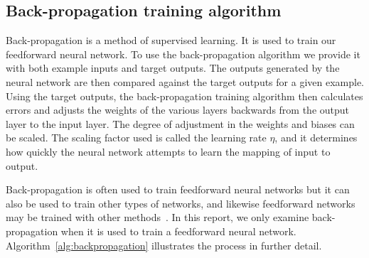 \documentclass[11pt]{article}
\begin{document}

\subsection{Back-propagation training algorithm} %
\label{sub:backpropagation_training_algorithm}

Back-propagation is a method of supervised learning. It is used to train our feedforward neural network. To use the back-propagation
algorithm we provide it with both example inputs and target outputs. The outputs generated by the neural network are then compared
against the target outputs for a given example. Using the target outputs, the back-propagation training algorithm then calculates errors
and adjusts the weights of the various layers backwards from the output layer to the input layer. The degree of adjustment in the
weights and biases can be scaled. The scaling factor used is called the learning rate $\eta$, and it determines how quickly the neural
network attempts to learn the mapping of input to output.~\cite{Backprop, skapura}

Back-propagation is often used to train feedforward neural networks but it can also be used to train other types of networks, and
likewise feedforward networks may be trained with other methods~\cite{Backprop, skapura}. In this report, we only examine
back-propagation when it is used to train a feedforward neural network. Algorithm~\ref{alg:backpropagation} illustrates the process in
further detail.
\end{document}
